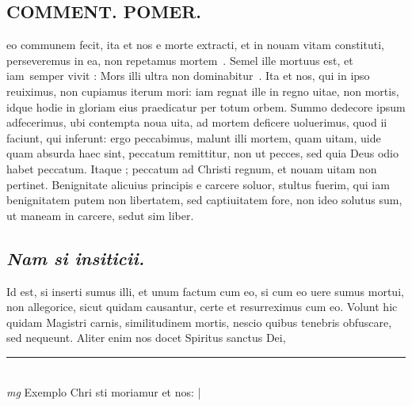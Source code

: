 \documentclass{article}
\begin{document}
\begin{pages}
\section*{COMMENT. POMER.  }\pstart eo communem fecit, ita et nos e morte extracti, et in nouam vitam constituti, perseveremus in ea, non repetamus mortem . Semel ille mortuus est, et iam semper vivit : Mors illi ultra non dominabitur .  Ita et nos, qui in ipso reuiximus, non cupiamus iterum mori: iam regnat ille in regno uitae, non mortis, idque hodie in gloriam eius praedicatur per totum orbem. Summo dedecore ipsum adfecerimus, ubi contempta noua uita, ad mortem deficere uoluerimus, quod ii faciunt, qui inferunt: ergo peccabimus, malunt illi mortem, quam uitam, uide quam absurda haec sint, peccatum remittitur, non ut pecces, sed quia Deus odio habet peccatum. Itaque ; peccatum ad Christi regnum, et nouam uitam non pertinet. Benignitate alicuius principis e carcere soluor, stultus fuerim, qui iam benignitatem putem non libertatem, sed captiuitatem fore, non ideo solutus sum, ut maneam in carcere, sedut sim liber.   \pend
{}
{}
\subsection*{\textit{Nam si insiticii. }}\pstart Id est, si inserti sumus illi, et unum factum cum eo, si cum eo uere sumus mortui, non allegorice, sicut quidam causantur, certe et resurreximus cum eo. Volunt hic quidam Magistri carnis, similitudinem mortis, nescio quibus tenebris obfuscare, sed nequeunt. Aliter enim nos docet Spiritus sanctus Dei,  \pend
\vspace{0.5cm}\noindent
\vspace{0.2cm}\rule{1cm}{0.2pt}\\ 
\hspace{0.2cm}\textit{mg}
\footnotesize Exemplo Chri sti moriamur et nos: 
\normalsize| 

\end{pages}
\end{document}
